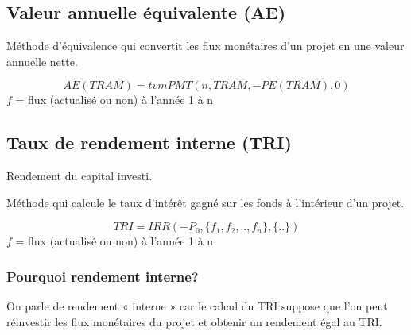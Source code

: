 \subsection{Valeur annuelle équivalente (AE)}
     Méthode d'équivalence qui convertit les flux monétaires d'un projet en une valeur annuelle nette.
    \begin{RoundBox}
        {\small $$AE(TRAM)=tvmPMT(n, TRAM,-PE(TRAM),0)$$}
        {\scriptsize
            $f$ = flux (actualisé ou non) à l'année 1 à n
        }
    \end{RoundBox}
    \noindent{}

\subsection{Taux de rendement interne (TRI)}
     Rendement du capital investi.

     Méthode qui calcule le taux d'intérêt gagné sur les fonds à l'intérieur d'un projet.
    \begin{RoundBox}
        $$TRI=IRR(-P_0,\{f_1, f_2, .., f_n\},\{..\})$$
        {\scriptsize
            $f$ = flux (actualisé ou non) à l'année 1 à n
        }
    \end{RoundBox}
    \noindent{}
    \subsubsection{Pourquoi rendement interne?}
        On parle de rendement « interne » car le calcul du TRI suppose que l’on peut réinvestir les flux monétaires du projet et obtenir un rendement égal au TRI.
    
